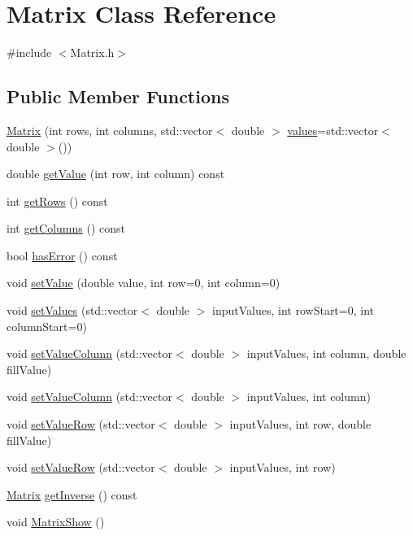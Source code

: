 \hypertarget{classMatrix}{}\section{Matrix Class Reference}
\label{classMatrix}


{\ttfamily \#include $<$Matrix.\+h$>$}

\subsection*{Public Member Functions}
\begin{DoxyCompactItemize}
\item 
\hyperlink{classMatrix_a5d39846f7d1e7f2f0ca9cb49117221e1}{Matrix} (int rows, int columns, std\+::vector$<$ double $>$ \hyperlink{classMatrix_a5987175ae045377790ff0b1f6cfd2e7b}{values}=std\+::vector$<$ double $>$())
\item 
double \hyperlink{classMatrix_ab752671c6461d950962e151a1af251ce}{get\+Value} (int row, int column) const
\item 
int \hyperlink{classMatrix_ad1b2433d295efcbf371e6f636db757e9}{get\+Rows} () const
\item 
int \hyperlink{classMatrix_a37d08315d9b28e5922e1a75b4d2a4cb9}{get\+Columns} () const
\item 
bool \hyperlink{classMatrix_abf6343d2b9345e08ef800fbc8f19e34e}{has\+Error} () const
\item 
void \hyperlink{classMatrix_a8271fe6ec51ea43fdf77f4b7f96333d9}{set\+Value} (double value, int row=0, int column=0)
\item 
void \hyperlink{classMatrix_a08f522fc56b7649a4242e7a0aefdfadd}{set\+Values} (std\+::vector$<$ double $>$ input\+Values, int row\+Start=0, int column\+Start=0)
\item 
void \hyperlink{classMatrix_ae33b973c97f6deed0f5936975c148aed}{set\+Value\+Column} (std\+::vector$<$ double $>$ input\+Values, int column, double fill\+Value)
\item 
void \hyperlink{classMatrix_a9af4d3f38ba62a90d31467dd43f48ac1}{set\+Value\+Column} (std\+::vector$<$ double $>$ input\+Values, int column)
\item 
void \hyperlink{classMatrix_ae204cbbd2279c21e0e22fa2fbd1a71ca}{set\+Value\+Row} (std\+::vector$<$ double $>$ input\+Values, int row, double fill\+Value)
\item 
void \hyperlink{classMatrix_af331f831fa9f4b800a57280818477cb8}{set\+Value\+Row} (std\+::vector$<$ double $>$ input\+Values, int row)
\item 
\hyperlink{classMatrix}{Matrix} \hyperlink{classMatrix_ade3fcddb0cc6a7e221a94e13afc7752c}{get\+Inverse} () const
\item 
void \hyperlink{classMatrix_a3c6fbdb8a8073ec2b2000614777ae930}{Matrix\+Show} ()
\end{DoxyCompactItemize}

